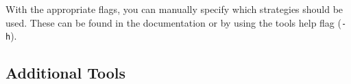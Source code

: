 \documentclass{clseminar}
\begin{document}
  With the appropriate flags, you can manually specify which strategies should be used. These can be found in the documentation \cite{mcrl2doc} or by using the tools help flag (\texttt{-h}).




  \subsection{Additional Tools}




  \newpage

  \appendix
\end{document}
